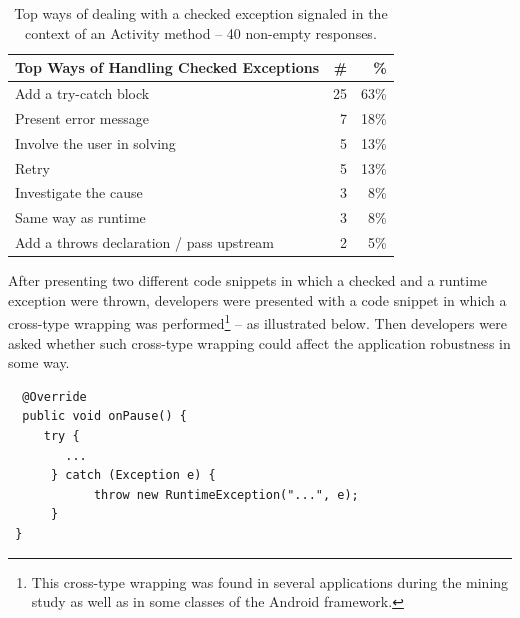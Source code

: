 \begin{table}
\scriptsize
\centering
\begin{tabular}{lrr}
\hline
\bfseries{Top Ways of Handling Checked Exceptions} & \bfseries{\#} & \bfseries{\%} \\
\hline
Add a try-catch block	& 25 &	63\% \\
Present error message	& 7 &	18\% \\
Involve the user in solving	& 5 &	13\% \\
Retry  &	5 &	13\% \\
Investigate the cause &	3 &	8\% \\
Same way as runtime	& 3 &	8\% \\
Add a throws declaration / pass upstream &	2 &	5\% \\
\hline
\end{tabular}
\caption{Top ways of dealing with a checked exception signaled in the context of an Activity method -- 40 non-empty responses. }
\label{tab:handlingruntime}
\end{table}		


After presenting two different code snippets in which a checked and a runtime exception were thrown, developers were presented with a code snippet in which a cross-type wrapping was performed\footnote{This cross-type wrapping was found in several applications during the mining study as well as in some classes of the Android framework.} -- as illustrated below. Then developers were asked whether such cross-type wrapping could affect the application robustness in some way.

{\footnotesize
\begin{verbatim}
  @Override
  public void onPause() {
     try {
        ...
      } catch (Exception e) {
            throw new RuntimeException("...", e);
      }
 }
\end{verbatim}
}

